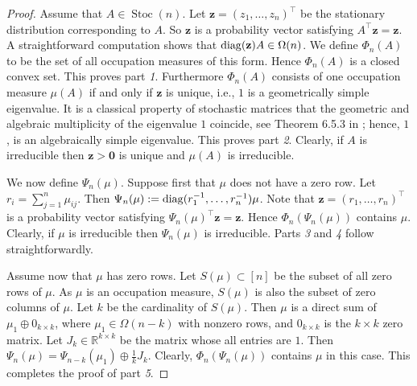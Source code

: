 \documentclass{amsart}
\newcommand{\diag}{\operatorname{diag}}
\newcommand{\R}{\mathbb{R}}
\newcommand{\z}{\mathbf{z}}
\newcommand{\0}{\mathbf{0}}
\newcommand{\1}{\mathbf{1}}
\def\diag{\mathop{{\rm diag}}\nolimits}
\newcommand{\trans}{^\top}
\theoremstyle{remark}
\numberwithin{equation}{section} %
\begin{document}
 \begin{proof}  Assume that $A\in \operatorname{Stoc}(n)$.  Let $\z=(z_1,\ldots,z_n)\trans$ be the stationary distribution corresponding to $A$.  So $\z$ is a probability vector satisfying $A\trans\z=\z$.  A straightforward computation shows that $\diag(\z)A\in\Omega(n)$.
We define $\Phi_n(A)$ to be the set of all occupation measures of this form. 
%
   Hence $\Phi_n(A)$ is a closed convex set.  This proves part \emph{1}.
Furthermore $\Phi_n(A)$ consists of one occupation measure $\mu(A)$ if and only if $\z$ is unique, i.e., $1$ is a geometrically  simple eigenvalue.  
It is a classical property of stochastic matrices that the geometric and algebraic multiplicity of the eigenvalue $1$ coincide, see Theorem 6.5.3 in \cite{Fribook}; hence, $1$, is an algebraically simple eigenvalue. 
%
This proves part \emph{2}.
Clearly, if $A$ is irreducible then $\z>\0$ is unique and $\mu(A)$ is irreducible.

We now define $\Psi_n(\mu)$.  Suppose first that $\mu$ does not have a zero row.  Let $r_i=\sum_{j=1}^n \mu_{ij}$.  Then $\Psi_n(\mu):=\diag(r_1^{-1},\ldots,r_n^{-1})\mu$.  Note that $\z=(r_1,\ldots,r_n)\trans$ is a probability vector satisfying
$\Psi_n(\mu)\trans \z=\z$.  Hence $\Phi_n(\Psi_n(\mu))$ contains $\mu$.  Clearly, if $\mu$ is irreducible then $\Psi_n(\mu)$ is irreducible.  Parts \emph{3} and \emph{4} follow straightforwardly. 

Assume now that $\mu$ has zero rows.  Let $S(\mu)\subset [n]$ be the subset of all zero rows of $\mu$.  As $\mu$ is an occupation measure, $S(\mu)$ is also the subset of zero columns of $\mu$.  Let $k$ be the cardinality of $S(\mu)$.  Then $\mu$ is a direct sum of $\mu_1\oplus 0_{k\times k}$, where $\mu_1\in\Omega(n-k)$ with nonzero rows, and
$0_{k\times k}$ is the $k\times k$ zero matrix.  Let $J_k\in\R^{k\times k}$ be the matrix whose all entries are $1$.  Then $\Psi_n(\mu)=\Psi_{n-k}(\mu_1)\oplus \frac{1}{k}J_k$.
Clearly, $\Phi_n(\Psi_n(\mu))$ contains $\mu$ in this case.  This completes the proof of part \emph{5}.\end{proof}
\end{document}
